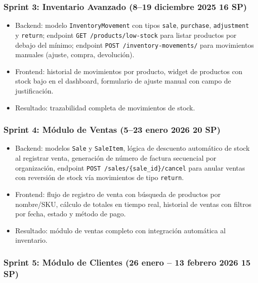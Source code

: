 \subsubsection{Sprint 3: Inventario Avanzado (8--19 diciembre 2025 \textbar{} 16 SP)}\label{sprint-3-inventario-avanzado-819-diciembre-2025-16-sp}

\begin{itemize}
\tightlist
\item
  Backend: modelo \texttt{InventoryMovement} con tipos \texttt{sale}, \texttt{purchase}, \texttt{adjustment} y \texttt{return}; endpoint \texttt{GET\ /products/low-stock} para listar productos por debajo del mínimo; endpoint \texttt{POST\ /inventory-movements/} para movimientos manuales (ajuste, compra, devolución).
\item
  Frontend: historial de movimientos por producto, widget de productos con stock bajo en el dashboard, formulario de ajuste manual con campo de justificación.
\item
  Resultado: trazabilidad completa de movimientos de stock.
\end{itemize}

\subsubsection{Sprint 4: Módulo de Ventas (5--23 enero 2026 \textbar{} 20 SP)}\label{sprint-4-muxf3dulo-de-ventas-523-enero-2026-20-sp}

\begin{itemize}
\tightlist
\item
  Backend: modelos \texttt{Sale} y \texttt{SaleItem}, lógica de descuento automático de stock al registrar venta, generación de número de factura secuencial por organización, endpoint \texttt{POST\ /sales/\{sale\_id\}/cancel} para anular ventas con reversión de stock vía movimientos de tipo \texttt{return}.
\item
  Frontend: flujo de registro de venta con búsqueda de productos por nombre/SKU, cálculo de totales en tiempo real, historial de ventas con filtros por fecha, estado y método de pago.
\item
  Resultado: módulo de ventas completo con integración automática al inventario.
\end{itemize}

\subsubsection{Sprint 5: Módulo de Clientes (26 enero -- 13 febrero 2026 \textbar{} 15 SP)}\label{sprint-5-muxf3dulo-de-clientes-26-enero-13-febrero-2026-15-sp}

